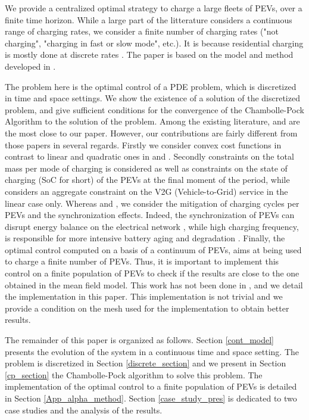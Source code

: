 \documentclass[conference]{IEEEtran}
\begin{document}
We provide a centralized optimal strategy to charge a large fleets of PEVs, over a finite time horizon.
While a large part of the litterature considers a continuous range of charging rates, we consider a finite number of charging rates ("not charging", "charging in fast or slow mode", etc.). It is because residential charging is mostly done at discrete rates \cite{nimalsiri2019survey}. The paper is based on the model and method developed in \cite{seguret2021mean}.
 
  The problem here is the optimal control of a PDE problem, which is discretized in time and space settings. 
We show the existence of a solution of the discretized problem, and give sufficient conditions for the convergence of the Chambolle-Pock Algorithm to the solution of the problem.
Among the existing literature, \cite{le2015optimal} and \cite{le2016pde} are the most close to our paper. However, our contributions are fairly different from those papers in several regards. Firstly we consider convex cost functions in contrast to linear and quadratic ones in  \cite{le2015optimal} and \cite{le2016pde}. Secondly constraints on the total mass per mode of charging is considered as well as constraints on the state of charging (SoC for short) of the PEVs at the final moment of the period, while \cite{le2015optimal} considers an aggregate constraint on the V2G (Vehicle-to-Grid) service in the linear case only. Whereas \cite{le2015optimal} and \cite{le2016pde}, we consider the mitigation of charging cycles per PEVs and the synchronization effects.
Indeed, the synchronization of PEVs can disrupt energy balance on the electrical network \cite{turitsyn2010robust}, while high charging frequency,
 is responsible for more intensive battery aging and degradation \cite{de2015impact, malhotra2016impact}. Finally, the optimal control computed on a basis of a continuum of PEVs, aims at being used to charge a finite number of PEVs. Thus, it is important to implement this control on a finite population of PEVs to check if the results are close to the one obtained in the mean field model. This work has not been done in \cite{seguret2021mean}, and we detail the implementation in this paper. This implementation is not trivial and we provide a condition on the mesh used for the implementation to obtain better results.

The remainder of this paper is organized as follows. Section \ref{cont_model} presents the evolution of the system in a continuous time and space setting. The problem is discretized in Section \ref{discrete_section} and we present in Section \ref{cp_section} the Chambolle-Pock algorithm to solve this problem. The implementation of the optimal control to a finite population of PEVs is detailed in Section \ref{App_alpha_method}. Section \ref{case_study_pres} is dedicated to two case studies and the analysis of the results.
\end{document}

